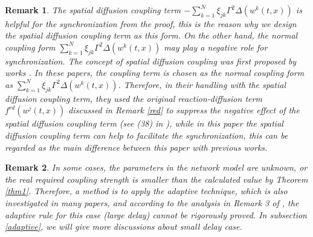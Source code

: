 \documentclass[review]{elsarticle}
\newtheorem{rem}{Remark}
\begin{document}
\begin{rem}
The spatial diffusion coupling term  $-\sum\limits_{k=1}^N\xi_{jk}\Gamma^2
\Delta(w^k(t,x))$ is helpful for the synchronization from the proof, this is the reason why we design the spatial diffusion coupling term as this form. On the other hand, the normal coupling form $\sum\limits_{k=1}^N\xi_{jk}\Gamma^2
\Delta(w^k(t,x))$ may play a negative role for synchronization. The concept of spatial diffusion coupling was first proposed by works \cite{WW2014,WWHR2016}. In these papers, the coupling term is chosen as the normal coupling form as $\sum\limits_{k=1}^N\xi_{jk}\Gamma^2
\Delta(w^k(t,x))$. Therefore, in their handling with the spatial diffusion coupling term, they used the original reaction-diffusion term $f^{rd}(w^j(t,x))$ discussed in Remark \ref{red} to suppress the negative effect of the spatial diffusion coupling term (see (38) in \cite{WWHR2016}), while in this paper the spatial diffusion coupling term can help to facilitate the synchronization, this can be regarded as the main difference between this paper with previous works.
\end{rem}

\begin{rem}
In some cases, the parameters in the network model are unknown, or the real required coupling strength is smaller than the calculated value by Theorem \ref{thm1}. Therefore, a method is to apply the adaptive technique, which is also investigated in many papers, and according to the analysis in Remark 3 of \cite{LC15}, the adaptive rule for this case (large delay) cannot be rigorously proved. In subsection \ref{adaptive}, we will give more discussions about small delay case.
\end{rem}
\end{document}

